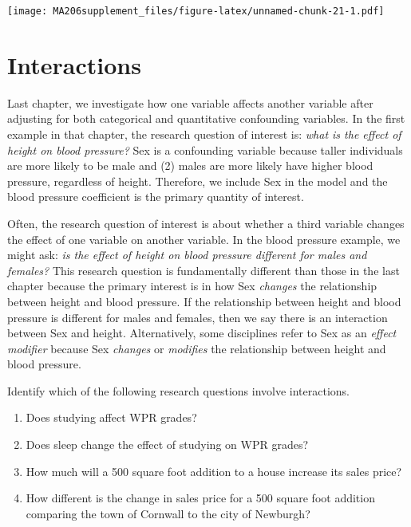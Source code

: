 \documentclass[]{book}
\newenvironment{Shaded}{\begin{snugshade}}{\end{snugshade}}
\newcommand{\KeywordTok}[1]{\textcolor[rgb]{0.13,0.29,0.53}{\textbf{#1}}}
\newcommand{\NormalTok}[1]{#1}
\newcommand{\OperatorTok}[1]{\textcolor[rgb]{0.81,0.36,0.00}{\textbf{#1}}}
\begin{document}
\begin{Shaded}
\end{Shaded}

\texttt{[image: MA206supplement\_files/figure-latex/unnamed-chunk-21-1.pdf]}

\hypertarget{interactions}{%
\chapter{Interactions}\label{interactions}}

Last chapter, we investigate how one variable affects another variable after adjusting for both categorical and quantitative confounding variables. In the first example in that chapter, the research question of interest is: \emph{what is the effect of height on blood pressure?} Sex is a confounding variable because taller individuals are more likely to be male and (2) males are more likely have higher blood pressure, regardless of height. Therefore, we include Sex in the model and the blood pressure coefficient is the primary quantity of interest.

Often, the research question of interest is about whether a third variable changes the effect of one variable on another variable. In the blood pressure example, we might ask: \emph{is the effect of height on blood pressure different for males and females?} This research question is fundamentally different than those in the last chapter because the primary interest is in how Sex \emph{changes} the relationship between height and blood pressure. If the relationship between height and blood pressure is different for males and females, then we say there is an interaction between Sex and height. Alternatively, some disciplines refer to Sex as an \emph{effect modifier} because Sex \emph{changes} or \emph{modifies} the relationship between height and blood pressure.

Identify which of the following research questions involve interactions.

\begin{enumerate}
\def\labelenumi{\alph{enumi})}
\item
  Does studying affect WPR grades?
\item
  Does sleep change the effect of studying on WPR grades?
\item
  How much will a 500 square foot addition to a house increase its sales price?
\item
  How different is the change in sales price for a 500 square foot addition comparing the town of Cornwall to the city of Newburgh?
\end{enumerate}
\end{document}
